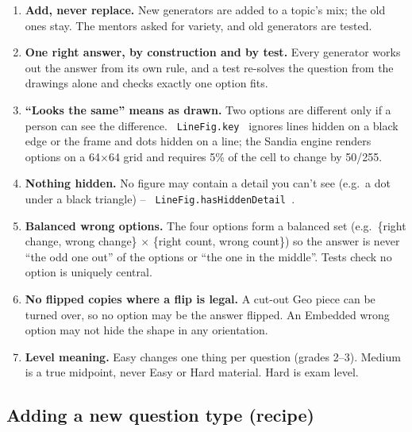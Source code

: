 \documentclass[12pt,a4paper]{article}
\newcommand{\codebs}{\symbol{92}\penalty50\relax}
\newcommand{\code}[1]{\texttt{\let\textbackslash\codebs\XeTeXinterchartokenstate=1 #1\XeTeXinterchartokenstate=0 }}
\begin{document}
\begin{enumerate}
\item \textbf{Add, never replace.} New generators are added to a topic's mix; the old ones stay. The mentors asked for variety, and old generators are tested.
\item \textbf{One right answer, by construction and by test.} Every generator works out the answer from its own rule, and a test re-solves the question from the drawings alone and checks exactly one option fits.
\item \textbf{``Looks the same'' means as drawn.} Two options are different only if a person can see the difference. \code{LineFig.key} ignores lines hidden on a black edge or the frame and dots hidden on a line; the Sandia engine renders options on a 64$\times$64 grid and requires 5\% of the cell to change by 50/255.
\item \textbf{Nothing hidden.} No figure may contain a detail you can't see (e.g.\ a dot under a black triangle) -- \code{LineFig.hasHiddenDetail}.
\item \textbf{Balanced wrong options.} The four options form a balanced set (e.g.\ \{right change, wrong change\} $\times$ \{right count, wrong count\}) so the answer is never ``the odd one out'' of the options or ``the one in the middle''. Tests check no option is uniquely central.
\item \textbf{No flipped copies where a flip is legal.} A cut-out Geo piece can be turned over, so no option may be the answer flipped. An Embedded wrong option may not hide the shape in any orientation.
\item \textbf{Level meaning.} Easy changes one thing per question (grades 2--3). Medium is a true midpoint, never Easy or Hard material. Hard is exam level.
\end{enumerate}

\subsection{Adding a new question type (recipe)}
\end{document}

